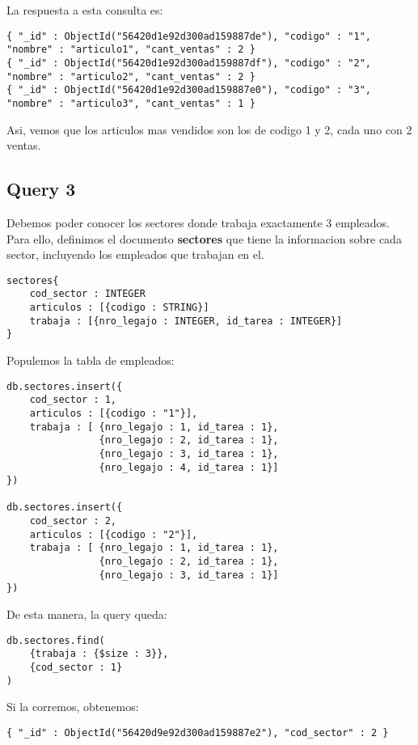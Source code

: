 La respuesta a esta consulta es:

\begin{verbatim}
{ "_id" : ObjectId("56420d1e92d300ad159887de"), "codigo" : "1", "nombre" : "articulo1", "cant_ventas" : 2 }
{ "_id" : ObjectId("56420d1e92d300ad159887df"), "codigo" : "2", "nombre" : "articulo2", "cant_ventas" : 2 }
{ "_id" : ObjectId("56420d1e92d300ad159887e0"), "codigo" : "3", "nombre" : "articulo3", "cant_ventas" : 1 }
\end{verbatim}

Asi, vemos que los articulos mas vendidos son los de codigo 1 y 2, cada uno con 2 ventas.

\subsection{Query 3}
Debemos poder conocer los sectores donde trabaja exactamente 3 empleados. Para ello, definimos el documento \textbf{sectores} que tiene la informacion sobre cada sector, incluyendo los empleados que trabajan en el.

\begin{verbatim}
sectores{
	cod_sector : INTEGER
	articulos : [{codigo : STRING}]
	trabaja : [{nro_legajo : INTEGER, id_tarea : INTEGER}]
}
\end{verbatim}

Populemos la tabla de empleados:

\begin{verbatim}
db.sectores.insert({
	cod_sector : 1,
	articulos : [{codigo : "1"}],
	trabaja : [	{nro_legajo : 1, id_tarea : 1},
				{nro_legajo : 2, id_tarea : 1},
				{nro_legajo : 3, id_tarea : 1},
				{nro_legajo : 4, id_tarea : 1}]
})

db.sectores.insert({
	cod_sector : 2,
	articulos : [{codigo : "2"}],
	trabaja : [	{nro_legajo : 1, id_tarea : 1},
				{nro_legajo : 2, id_tarea : 1},
				{nro_legajo : 3, id_tarea : 1}]
})
\end{verbatim}

De esta manera, la query queda:

\begin{verbatim}
db.sectores.find(
	{trabaja : {$size : 3}},
	{cod_sector : 1}
)
\end{verbatim}

Si la corremos, obtenemos:

\begin{verbatim}
{ "_id" : ObjectId("56420d9e92d300ad159887e2"), "cod_sector" : 2 }
\end{verbatim}

